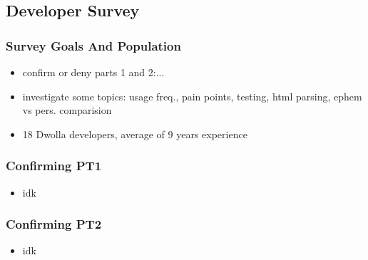 \subsection{Developer Survey}

\begin{frame}
\frametitle{Survey Goals And Population}
\begin{itemize}
\item confirm or deny parts 1 and 2:...
\item investigate some topics: usage freq., pain points, testing, html parsing, ephem vs pers. comparision
\item 18 Dwolla developers, average of 9 years experience
\end{itemize}
\end{frame}

\begin{frame}
\frametitle{Confirming PT1}
\begin{itemize}
\item idk
\end{itemize}
\end{frame}


\begin{frame}
\frametitle{Confirming PT2}
\begin{itemize}
\item idk
\end{itemize}
\end{frame}


